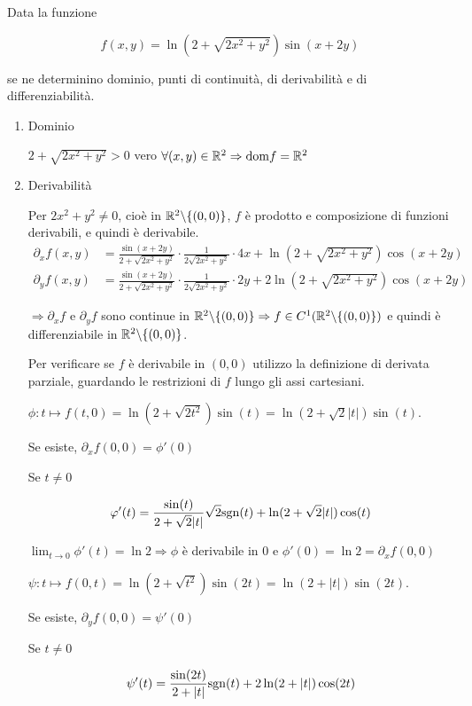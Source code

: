 \begin{exbar}
\begin{example}
	Data la funzione 
	
	$$f(x,y)=\ln(2+\sqrt{2x^2+y^2})\sin(x+2y)$$ 
	
	se ne determinino dominio, punti di continuità, di derivabilità e di differenziabilità.
	\begin{enumerate}
		\item Dominio
		
		$2+\sqrt{2x^2+y^2}>0$ vero $\forall(x,y)\in\mathbb{R}^2 \Rightarrow \mathrm{dom} f =\mathbb{R}^2$
		
		\item Derivabilità
		
		Per $2x^2+y^2\neq 0$, cioè in $\mathbb{R}^2\backslash\{(0,0)\}$, $f$ è prodotto e composizione di funzioni derivabili, e quindi è derivabile.
		\begin{align*} 
			\partial_x f(x,y)&=\frac{\sin(x+2y)}{2+\sqrt{2x^2+y^2}}\cdot \frac{1}{2\sqrt{2x^2+y^2}}\cdot4x+\ln(2+\sqrt{2x^2+y^2})\cos(x+2y)
			\\
			\partial_yf(x,y)&=\frac{\sin(x+2y)}{2+\sqrt{2x^2+y^2}}\cdot\frac{1}{2\sqrt{2x^2+y^2}}\cdot 2y+2\ln(2+\sqrt{2x^2+y^2})\cos(x+2y)
		\end{align*}
		
		$\Rightarrow \partial_x f$ e $\partial_y f$ sono continue in $\mathbb{R}^2\backslash\{(0,0)\} \Rightarrow f \in C^1(\mathbb{R}^2\backslash\{(0,0)\})$ e quindi è differenziabile in $\mathbb{R}^2\backslash\{(0,0)\}$.
		
		Per verificare se $f$ è derivabile in $(0,0)$ utilizzo la definizione di derivata parziale, guardando le restrizioni di $f$ lungo gli assi cartesiani.
		
		$\phi: t \mapsto f(t,0)=\ln(2+\sqrt{2t^2})\sin(t)= \ln(2+\sqrt{2}|t|)\sin(t)$.
		
		Se esiste, $\partial_x f(0,0)=\phi'(0)$
		
		Se $t\neq 0$
		
		$$\varphi'(t)=\frac{\sin(t)}{2+\sqrt{2}|t|}\sqrt{2}\mathrm{sgn}(t)+\ln(2+\sqrt{2}|t|)\cos(t)$$
		
		$\lim_{t \rightarrow0} \phi'(t)=\ln 2 \Rightarrow \phi$ è derivabile in $0$ e $\phi'(0)=\ln 2=\partial_x f(0,0)$
		
		$\psi: t \mapsto f(0,t)=\ln(2+\sqrt{t^2})\sin(2t)=\ln(2+|t|)\sin(2t)$.
		
		Se esiste, $\partial_y f(0,0)=\psi'(0)$
		
		Se $t \neq 0$
		
		$$\psi'(t)=\frac{\sin(2t)}{2+|t|}\mathrm{sgn} (t)+2\ln(2+|t|)\cos(2t)$$
		

\end{enumerate}
\end{example}
\end{exbar}
